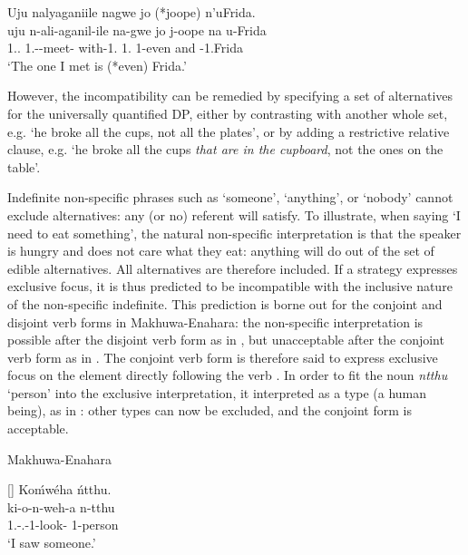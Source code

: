 \documentclass[output=paper]{langscibook}
\begin{document}
\z

\ea
\label{ex:kinyakyusa-frida}
Uju nalyaganiile nagwe jo (*joope) n’uFrida.\\
\gll
uju  n-ali-aganil-ile  na-gwe  jo  j-oope  na  u-Frida\\
1.\DEM.\PROX{}  1\SG.\SM-\PST{}-meet-\PFV{}  with-1.\PRO{}  1.\IDCOP{}  1-even  and  \AUG{}-1.Frida\\
\glt
‘The one I met is (*even) Frida.’\\


\z

However, the incompatibility can be remedied by specifying a set of alternatives for the universally quantified DP, either by contrasting with another whole set, e.g. ‘he broke all the cups, not all the plates’, or by adding a restrictive relative clause, e.g. ‘he broke all the cups \textit{that are in the cupboard}, not the ones on the table’.

Indefinite non-specific phrases such as ‘someone’, ‘anything’, or ‘nobody’ cannot exclude alternatives: any (or no) referent will satisfy. To illustrate, when saying ‘I need to eat something’, the natural non-specific interpretation is that the speaker is hungry and does not care what they eat: anything will do out of the set of edible alternatives. All alternatives are therefore included. If a strategy expresses exclusive focus, it is thus predicted to be incompatible with the inclusive nature of the non-specific indefinite. This prediction is borne out for the conjoint and disjoint verb forms in Makhuwa-Enahara: the non-specific interpretation is possible after the disjoint verb form as in , but unacceptable after the conjoint verb form as in . The conjoint verb form is therefore said to express exclusive focus on the element directly following the verb \citep{vanderWal2011}. In order to fit the noun \textit{ntthu} ‘person’ into the exclusive interpretation, it interpreted as a type (a human being), as in : other types can now be excluded, and the conjoint form is acceptable.

\ea
Makhuwa-Enahara \citep[1740]{vanderWal2011}

\label{bkm:Ref122698002}
\ea
\begin{xlist}
\exi{\DJ}
[]{
\label{bkm:Ref122698002:a}
Koḿwéha ńtthu.\\
\gll
ki-o-n-weh-a  n-tthu\\
1\SG{}.\SM{}-\PFV{}.\DJ{}-1\OM{}-look-\FV{}  1-person\\
\glt
‘I saw someone.’\\
}
\end{xlist}
\end{document}
